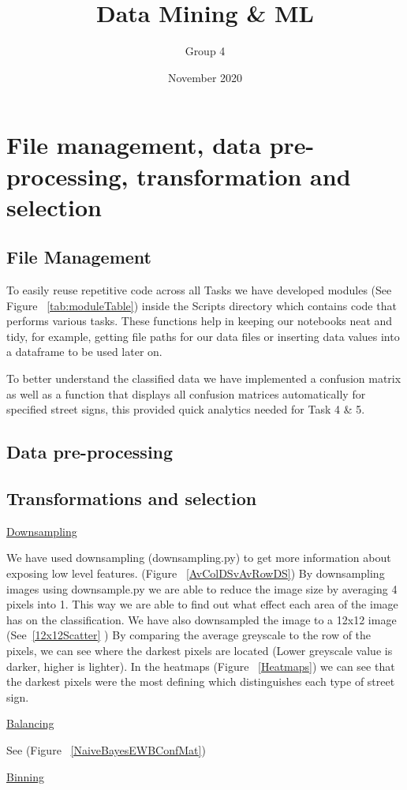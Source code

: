 \documentclass[11pt]{article}
\title{Data Mining \& ML}
\author{ Group 4 }
\date{November 2020}
\begin{document}
\maketitle

\pagebreak

\tableofcontents
\thispagestyle{empty}
\pagebreak
\setcounter{page}{1}

\pagebreak

\section{File management, data pre-processing, transformation and selection} 
\subsection{File Management}

To easily reuse repetitive code across all Tasks we have developed modules (See Figure ~\ref{tab:moduleTable}) inside 
the Scripts directory which contains code that performs various tasks. These functions help
in keeping our notebooks neat and tidy, for example, getting file paths for our data files or 
inserting data values into a dataframe to be used later on.
\par
To better understand the classified data we have implemented a confusion matrix as well as 
a function that displays all confusion matrices automatically for specified street signs, this 
provided quick analytics needed for Task 4 \& 5.

\subsection{Data pre-processing}


\subsection{Transformations and selection}\label{sec:transSel}

\underline{Downsampling}
\par
We have used downsampling (downsampling.py) to get more information about exposing low level features.
(Figure ~\ref{AvColDSvAvRowDS}) By downsampling images using downsample.py we are able to reduce the image size by averaging 4 pixels into 1. This way we are able to find out what effect each area of the image has on the classification.
We have also downsampled the image to a 12x12 image (See~\ref{12x12Scatter} )
By comparing the average greyscale to the row of the pixels, we can see where the
darkest pixels are located (Lower greyscale value is darker, higher is lighter).
In the heatmaps (Figure ~\ref{Heatmaps}) we can see that the darkest pixels were the most defining which distinguishes 
each type of street sign.
\par
\underline{Balancing}
\par
See (Figure ~\ref{NaiveBayesEWBConfMat}) 
\par
\underline{Binning}
\par
\end{document}
